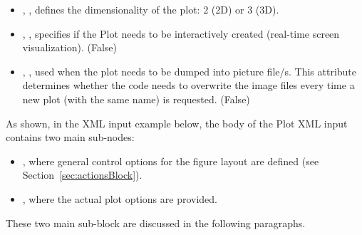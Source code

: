 \vspace{-5mm}
\begin{itemize}
  \itemsep0em
  \item {}, , defines the
  dimensionality of the plot: 2 (2D) or 3 (3D).
  \item {}, , specifies if
  the Plot needs to be interactively created (real-time screen visualization).
  (False)
  \item {}, , used when the
  plot needs to be dumped into picture file/s. This attribute determines whether
  the code needs to overwrite the image files every time a new plot (with the
  same name) is requested.
  (False)
\end{itemize}
\vspace{-5mm}

As shown, in the XML input example below, the body of the Plot XML input
contains two main sub-nodes:
\vspace{-5mm}
\begin{itemize}
  \itemsep0em
  \item {}, where general control options for the figure layout
  are defined (see Section~\ref{sec:actionsBlock}).
  \item {}, where the actual plot options are provided.
  \vspace{-5mm}
\end{itemize}

These two main sub-block are discussed in the following paragraphs.
%
